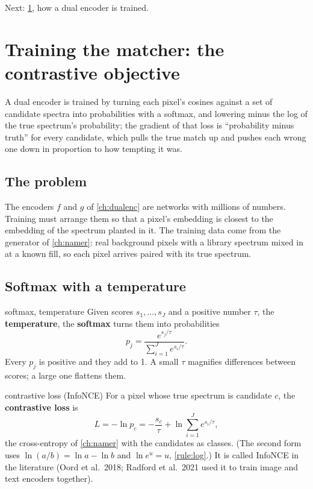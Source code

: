\documentclass[11pt,a4paper,oneside,openany]{book}
\newcommand{\nextchapter}[1]{\par\medskip\noindent\hfill\textsf{\small Next: #1}\par}
\begin{document}
\nextchapter{\cref{ch:contrastive}, how a dual encoder is trained.}
\chapter{Training the matcher: the contrastive objective}
\label{ch:contrastive}

\begin{onething}
A dual encoder is trained by turning each pixel's cosines against a set of candidate spectra into probabilities with a softmax, and lowering minus the log of the true
spectrum's probability; the gradient of that loss is ``probability minus truth'' for every candidate, which pulls the true match up and pushes each wrong one down in
proportion to how tempting it was.
\end{onething}

\section{The problem}

The encoders $f$ and $g$ of \cref{ch:dualenc} are networks with millions of numbers. Training must arrange them so that a pixel's embedding is closest to the embedding
of the spectrum planted in it. The training data come from the generator of \cref{ch:namer}: real background pixels with a library spectrum mixed in at a known fill,
so each pixel arrives paired with its true spectrum.

\section{Softmax with a temperature}

\begin{defn}{softmax, temperature}
Given scores $s_1,\dots,s_J$ and a positive number $\tau$, the \textbf{temperature}, the \textbf{softmax} turns them into probabilities
\[
  p_j=\frac{e^{s_j/\tau}}{\sum_{i=1}^{J}e^{s_i/\tau}} .
\]
Every $p_j$ is positive and they add to 1. A small $\tau$ magnifies differences between scores; a large one flattens them.
\end{defn}

\begin{defn}{contrastive loss (InfoNCE)}
For a pixel whose true spectrum is candidate $c$, the \textbf{contrastive loss} is
\[
  L=-\ln p_c=-\frac{s_c}{\tau}+\ln\sum_{i=1}^{J}e^{s_i/\tau},
\]
the cross-entropy of \cref{ch:namer} with the candidates as classes. (The second form uses $\ln(a/b)=\ln a-\ln b$ and $\ln e^u=u$, \cref{rule:log}.) It is called
InfoNCE in the literature (Oord et al.\ 2018; Radford et al.\ 2021 used it to train image and text encoders together).
\end{defn}
\end{document}
